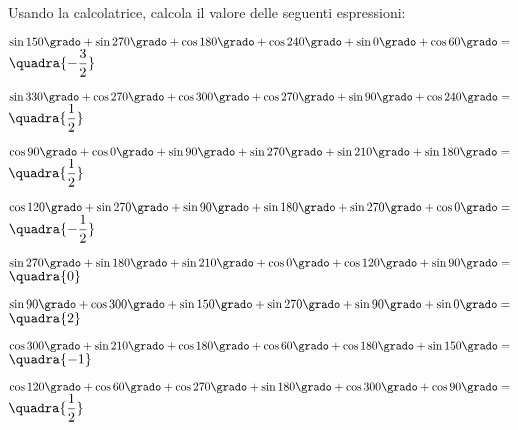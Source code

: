 \subsubsection*{}

\begin{esercizio}\label{ese:}
 Usando la calcolatrice, calcola il valore delle seguenti espressioni:
 \begin{enumeratea}
  \item  $\sin 150 \grado+ \sin 270 \grado+ \cos 180 \grado+ 
          \cos 240 \grado+ \sin 0 \grado+ \cos 60 \grado= $
   \hfill $\quadra{-\dfrac{3}{2}}$
  \item  $\sin 330 \grado+ \cos 270 \grado+ \cos 300 \grado+ 
          \cos 270 \grado+ \sin 90 \grado+ \cos 240 \grado= $
   \hfill $\quadra{\dfrac{1}{2}}$
  \item  $\cos 90 \grado + \cos 0 \grado + \sin 90 \grado + 
          \sin 270 \grado + \sin 210 \grado + \sin 180 \grado = $
   \hfill $\quadra{\dfrac{1}{2}}$
  \item  $\cos 120 \grado + \sin 270 \grado + \sin 90 \grado + 
          \sin 180 \grado + \sin 270 \grado + \cos 0 \grado = $
   \hfill $\quadra{-\dfrac{1}{2}}$
  \item  $\sin 270 \grado + \sin 180 \grado + \sin 210 \grado + 
          \cos 0 \grado + \cos 120 \grado + \sin 90 \grado = $
   \hfill $\quadra{0}$
  \item  $\sin 90 \grado + \cos 300 \grado + \sin 150 \grado + 
          \sin 270 \grado + \sin 90 \grado + \sin 0 \grado = $
   \hfill $\quadra{2}$
  \item  $\cos 300 \grado + \sin 210 \grado + \cos 180 \grado + 
          \cos 60 \grado + \cos 180 \grado + \sin 150 \grado = $
   \hfill $\quadra{-1}$
  \item  $\cos 120 \grado + \cos 60 \grado + \cos 270 \grado + 
          \sin 180 \grado + \cos 300 \grado + \cos 90 \grado = $
   \hfill $\quadra{\dfrac{1}{2}}$

\end{enumeratea}
\end{esercizio}

